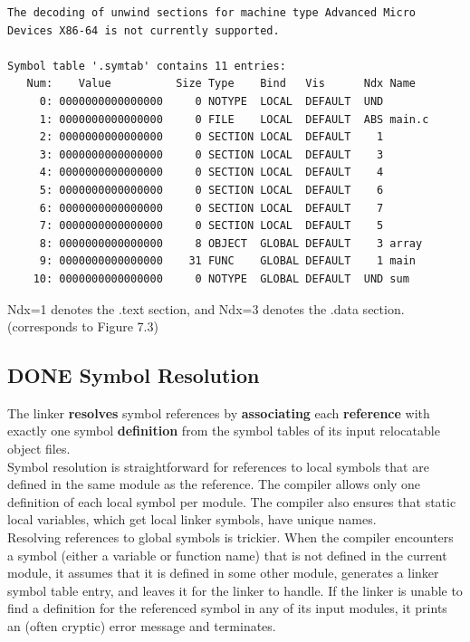 \documentclass[11pt]{article}
\begin{document}
\begin{verbatim}
The decoding of unwind sections for machine type Advanced Micro Devices X86-64 is not currently supported.

Symbol table '.symtab' contains 11 entries:
   Num:    Value          Size Type    Bind   Vis      Ndx Name
     0: 0000000000000000     0 NOTYPE  LOCAL  DEFAULT  UND 
     1: 0000000000000000     0 FILE    LOCAL  DEFAULT  ABS main.c
     2: 0000000000000000     0 SECTION LOCAL  DEFAULT    1 
     3: 0000000000000000     0 SECTION LOCAL  DEFAULT    3 
     4: 0000000000000000     0 SECTION LOCAL  DEFAULT    4 
     5: 0000000000000000     0 SECTION LOCAL  DEFAULT    6 
     6: 0000000000000000     0 SECTION LOCAL  DEFAULT    7 
     7: 0000000000000000     0 SECTION LOCAL  DEFAULT    5 
     8: 0000000000000000     8 OBJECT  GLOBAL DEFAULT    3 array
     9: 0000000000000000    31 FUNC    GLOBAL DEFAULT    1 main
    10: 0000000000000000     0 NOTYPE  GLOBAL DEFAULT  UND sum

\end{verbatim}


Ndx=1 denotes the .text section, and Ndx=3 denotes the .data section. (corresponds to Figure 7.3)\\

\subsection{{\bfseries\sffamily DONE} Symbol Resolution}
\label{sec:org825db14}
The linker \textbf{resolves} symbol references by \textbf{associating} each \textbf{reference} with exactly one symbol \textbf{definition} from the symbol tables of its input relocatable object files.\\

Symbol resolution is straightforward for references to local symbols that are defined in the same module as the reference. The compiler allows only one definition of each local symbol per module. The compiler also ensures that static local variables, which get local linker symbols, have unique names.\\

Resolving references to global symbols is trickier. When the compiler encounters a symbol (either a variable or function name) that is not defined in the current module, it assumes that it is defined in some other module, generates a linker symbol table entry, and leaves it for the linker to handle. If the linker is unable to find a definition for the referenced symbol in any of its input modules, it prints an (often cryptic) error message and terminates.\\
\end{document}
